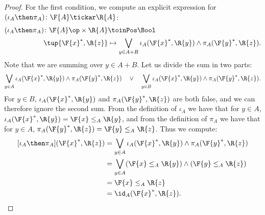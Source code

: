 \begin{proof}
    For the first condition, we compute  an explicit expression for $(\iota_A\then \pi_A) \colon \F{A} \tickar \R{A}$:
    \begin{equation}
    \begin{aligned}
        (\iota_A\then \pi_A) \colon  \F{A}\op\times \R{A} & \toinPos \Bool \\
                            \tup{\F{x}^*, \R{z}} &\mapsto
                            \bigvee_{y \in A + B} \iota_A(\F{x}^*,\R{y}) \wedge \pi_A(\F{y}^*,\R{z}).
    \end{aligned}
    \end{equation}
    Note that we are summing over $y \in A + B$. Let us divide the sum in two parts:
    \begin{equation}
    \bigvee_{y \in A} \iota_A(\F{x}^*,\R{y}) \wedge \pi_A(\F{y}^*,\R{z}) \quad\vee\quad
    \bigvee_{y \in B} \iota_A(\F{x}^*,\R{y}) \wedge \pi_A(\F{y}^*,\R{z}).
    \end{equation}
    For $y \in B$, $\iota_A(\F{x}^*,\R{y})$ and $\pi_A(\F{y}^*,\R{z})$ are both false, and we can therefore ignore the second sum.
    From the definition of $\iota_A$ we have that for $y\in A$, $ \iota_A(\F{x}^*,\R{y})=\F{x} \leq_A \R{y}$, and from the definition of $\pi_A$ we have that for $y\in A$, $\pi_A(\F{y}^*,\R{z})=\F{y} \leq_A \R{z}$. Thus we compute:
\begin{equation}
    \begin{aligned}
    [\iota_A\then \pi_A](\F{x}^*, \R{z}) &= \bigvee_{y \in A} \iota_A(\F{x}^*,\R{y}) \wedge \pi_A(\F{y}^*,\R{z})  \\
     &= \bigvee_{y \in A} (\F{x} \leq_A \R{y}) \wedge  (\F{y} \leq_A \R{z}) \\
     &= \F{x} \leq_A \R{z}\\
     &= \id_A(\F{x}^*, \R{z}).
\end{aligned}
\end{equation}
\end{proof}

